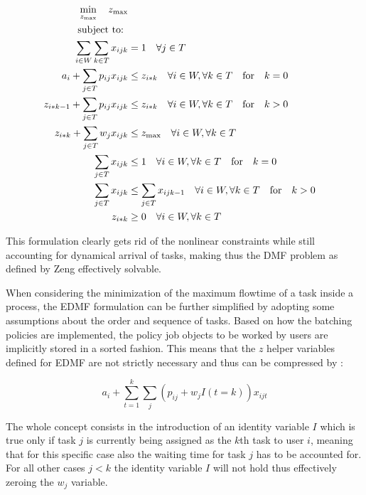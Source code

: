 \documentclass{seal_thesis}
\begin{document}
\begin{align}
    \min_{z_{\text{max}}} \quad z_{\text{max}}\\
    \text{subject to: } \notag \\
    \sum_{i \in W} \sum_{k \in T} x_{ijk} &= 1 \quad \forall j \in T\\
    a_i + \sum_{j \in T} p_{ij} x_{ijk} &\leq z_{i*k} \quad \forall i \in W, \forall k \in T \quad \text{for} \quad k=0\\
    z_{i*k-1} + \sum_{j \in T} p_{ij} x_{ijk} &\leq z_{i*k} \quad \forall i \in W, \forall k \in T \quad \text{for} \quad k>0\\
    z_{i*k}+ \sum_{j \in T} w_j x_{ijk} &\leq z_{\text{max}} \quad \forall i \in W, \forall k \in T\\
    \sum_{j \in T} x_{ijk} &\leq 1 \quad \forall i \in W, \forall k \in T \quad \text{for} \quad k=0\\
    \sum_{j \in T} x_{ijk} &\leq \sum_{j \in T} x_{ijk-1} \quad \forall i \in W, \forall k \in T \quad \text{for} \quad k>0\\
    z_{i*k} &\geq 0 \quad \forall i \in W, \forall k \in T
\end{align}

This formulation clearly gets rid of the nonlinear constraints while still accounting for dynamical arrival of tasks, making thus the DMF problem as defined by Zeng effectively solvable.

When considering the minimization of the maximum flowtime of a task inside a process, the EDMF formulation can be further simplified by adopting some assumptions about the order and sequence of tasks. Based on how the batching policies are implemented, the policy job objects to be worked by users are implicitly stored in a sorted fashion. This means that the $z$ helper variables defined for EDMF are not strictly necessary and thus can be compressed by :

\begin{equation}
\label{eq:simplified_z_with_k}
	a_i + \sum_{t=1}^k \sum_j (p_{ij} + w_j I(t=k))x_{ijt}
\end{equation}

The whole concept consists in the introduction of an identity variable $I$ which is true only if task $j$ is currently being assigned as the $k$th task to user $i$, meaning that for this specific case also the waiting time for task $j$ has to be accounted for. For all other cases \ie $j<k$ the identity variable $I$ will not hold thus effectively zeroing the $w_j$ variable.
\end{document}
